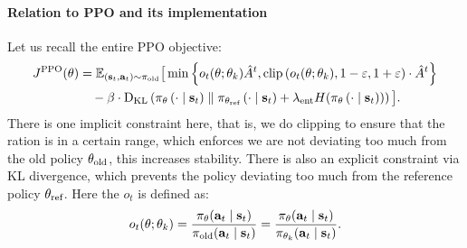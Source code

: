 \documentclass[11pt]{article}  %
\begin{document}
\paragraph{Relation to PPO and its implementation}
Let us recall the entire PPO objective:
\begin{align*}
  J^{\text{PPO}}(\theta) &= \mathbb{E}_{\substack{(\mathbf{s}_t, \mathbf{a}_t) \sim \pi_{\text{old}}}}\big[\min\left\{ o_t(\theta; \theta_k) \hat{A}^t, \text{clip}\left( o_t(\theta; \theta_k), 1-\varepsilon, 1+\varepsilon \right)\cdot\hat{A}^t \right\} \\
  & \quad - \beta \cdot {\rm D}_{\text{KL}}\left( \pi_{\theta}\left( \cdot \mid \mathbf{s}_t \right) \parallel \pi_{\theta_{\text{ref}}}\left( \cdot \mid \mathbf{s}_t \right) + \lambda_{\text{ent}} H(\pi_{\theta}\left( \cdot \mid \mathbf{s}_t \right)) \right)\big].
\end{align*}
There is one implicit constraint here, that is, we do clipping to ensure that the ration is in a certain range, which enforces we are not deviating too much from the old policy $\theta_{\text{old}}$, this increases stability.
There is also an explicit constraint via KL divergence, which prevents the policy deviating too much from the reference policy $\theta_{\text{ref}}$.
Here the $o_t$ is defined as: 
\begin{align*}
  o_t(\theta; \theta_k) = \frac{\pi_{\theta}(\mathbf{a}_t \mid \mathbf{s}_t)}{\pi_{\text{old}}(\mathbf{a}_t \mid \mathbf{s}_t)} = \frac{\pi_{\theta}(\mathbf{a}_t \mid \mathbf{s}_t)}{\pi_{\theta_k}(\mathbf{a}_t \mid \mathbf{s}_t)}.
\end{align*}
\end{document}
